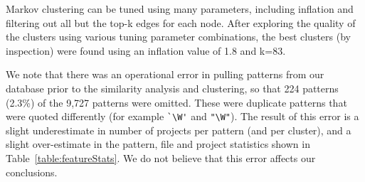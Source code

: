 Markov clustering can be tuned using many parameters, including inflation and filtering out all but the top-k edges for each node.  After exploring the quality of the clusters using various tuning parameter combinations, the best clusters (by inspection) were found using an inflation value of 1.8 and k=83.

We note that there was an operational error in pulling patterns from our database prior to the similarity analysis and clustering, so that 224 patterns (2.3\%) of the 9,727 patterns were omitted. These were duplicate patterns that were quoted differently (for example \verb!`\W'! and \verb!"\W"!).  The result of this error is a slight underestimate in number of projects per pattern (and per cluster), and a slight over-estimate in the pattern, file and project statistics shown in Table~\ref{table:featureStats}.  We do not believe that this error affects our conclusions.



